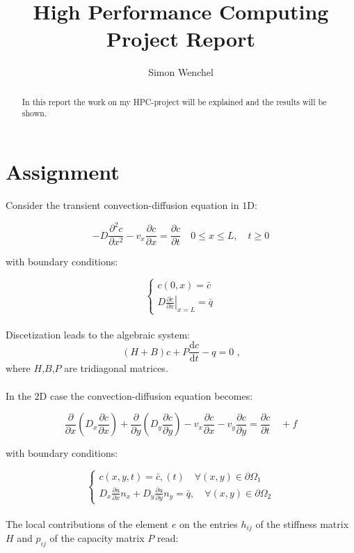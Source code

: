 \documentclass{article}
\title{High Performance Computing Project Report}
\author{Simon Wenchel}
\begin{document}
\maketitle

\begin{abstract}
In this report the work on my HPC-project will be explained and the results will be shown.

\end{abstract}

\section{Assignment}
Consider the transient convection-diffusion equation in $1\mathrm{D}$:

$$
-D \frac{\partial^{2} c}{\partial x^{2}}-v_{x} \frac{\partial c}{\partial x}=\frac{\partial c}{\partial t} \quad 0 \leq x \leq L, \quad t \geq 0
$$

with boundary conditions:

$$
\left\{\begin{array}{l}
c(0, x)=\bar{c} \\
\left.D \frac{\partial c}{\partial x}\right|_{x=L}=\bar{q}
\end{array}\right.
$$
\\
Discetization leads to the algebraic system:
$$
(H+B)c+P\frac{\mathrm{d}c}{\mathrm{d}t} - q = 0 \text{ ,}
$$
where $H$,$B$,$P$ are tridiagonal matrices.\\\\
In the $2 \mathrm{D}$ case the convection-diffusion equation becomes:

$$
\frac{\partial}{\partial x}\left(D_{x} \frac{\partial c}{\partial x}\right)+\frac{\partial}{\partial y}\left(D_{y} \frac{\partial c}{\partial y}\right)-v_{x} \frac{\partial c}{\partial x}-v_{y} \frac{\partial c}{\partial y}=\frac{\partial c}{\partial t} \quad+f
$$

with boundary conditions:

$$
\left\{\begin{array}{l}
c(x, y, t)=\bar{c},(t) \quad \forall(x, y) \in \partial \Omega_{1} \\
D_{x} \frac{\partial u}{\partial x} n_{x}+D_{y} \frac{\partial u}{\partial y} n_{y}=\bar{q}, \quad \forall(x, y) \in \partial \Omega_{2}
\end{array}\right.
$$
\\
The local contributions of the element $e$ on the entries $h_{i j}$ of the stiffness matrix $H$ and $p_{i j}$ of the capacity matrix $P$ read:
\end{document}
